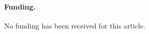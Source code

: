 \documentclass[11pt,a4paper]{article}
\begin{document}
\paragraph{Funding.} No funding has been received for this article.




\end{document}
